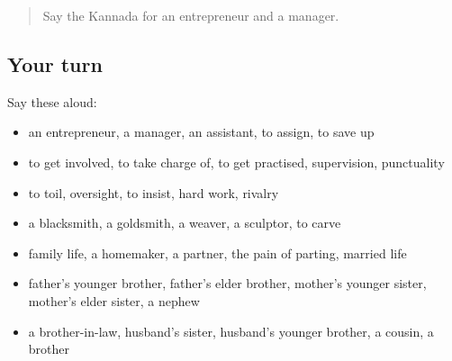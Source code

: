 \label{lesson:KA-R525-review-519-525}



\begin{quote}
Say the Kannada for an entrepreneur and a manager.
\end{quote}

\subsection*{Your turn}
Say these aloud:

\begin{itemize}
\raggedright
  \item an entrepreneur, a manager, an assistant, to assign, to save up
  \item to get involved, to take charge of, to get practised, supervision, punctuality
  \item to toil, oversight, to insist, hard work, rivalry
  \item a blacksmith, a goldsmith, a weaver, a sculptor, to carve
  \item family life, a homemaker, a partner, the pain of parting, married life
  \item father's younger brother, father's elder brother, mother's younger sister, mother's elder sister, a nephew
  \item a brother-in-law, husband's sister, husband's younger brother, a cousin, a brother
\end{itemize}

